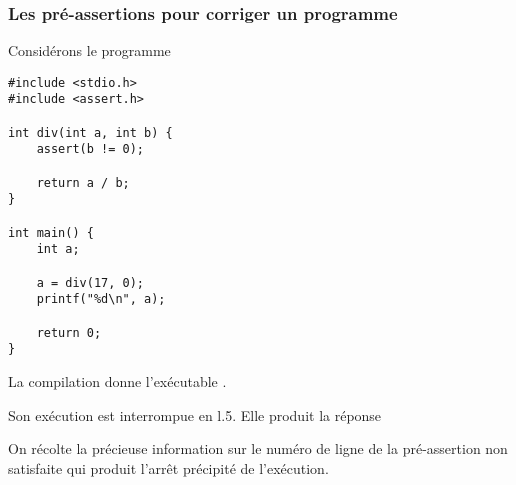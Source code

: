 \begin{frame}[fragile] 
    \frametitle{Les pré-assertions pour corriger un programme}
Considérons le programme
\begin{multicols}{2}
\begin{lstlisting}    
#include <stdio.h>
#include <assert.h>

int div(int a, int b) {
    assert(b != 0);

    return a / b;
}

int main() {
    int a;

    a = div(17, 0);
    printf("%d\n", a);

    return 0;
}
\end{lstlisting}
\begin{small}
La compilation  donne 
l'exécutable .
\medskip

Son exécution  est interrompue en l.5. Elle produit la 
réponse 
\smallskip

\medskip

On récolte la précieuse information sur le numéro de ligne de la 
pré-assertion non satisfaite qui produit l'arrêt précipité de 
l'exécution.
\end{small}
\end{multicols}
\end{frame}
